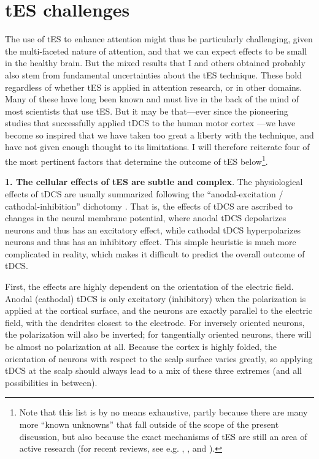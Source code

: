 \documentclass[11pt,]{memoir}
\let\rmarkdownfootnote\footnote%
\def\footnote{\protect\rmarkdownfootnote}
\begin{document}
\hypertarget{tes-challenges}{%
\section{tES challenges}\label{tes-challenges}}

The use of tES to enhance attention might thus be particularly challenging, given the multi-faceted nature of attention, and that we can expect effects to be small in the healthy brain. But the mixed results that I and others obtained probably also stem from fundamental uncertainties about the tES technique. These hold regardless of whether tES is applied in attention research, or in other domains. Many of these have long been known \autocites{Bikson2019}{Reato2019} and must live in the back of the mind of most scientists that use tES. But it may be that---ever since the pioneering studies that successfully applied tDCS to the human motor cortex \autocites{Nitsche2000}{Nitsche2001}---we have become so inspired that we have taken too great a liberty with the technique, and have not given enough thought to its limitations. I will therefore reiterate four of the most pertinent factors that determine the outcome of tES below\footnote{Note that this list is by no means exhaustive, partly because there are many more ``known unknowns'' that fall outside of the scope of the present discussion, but also because the exact mechanisms of tES are still an area of active research (for recent reviews, see e.g. \textcite{Fertonani2017}, \textcite{Bestmann2014}, and \textcite{Jackson2016}).}.

\textbf{1. The cellular effects of tES are subtle and complex}. The physiological effects of tDCS are usually summarized following the ``anodal-excitation / cathodal-inhibition'' dichotomy \autocite{Jacobson2012}. That is, the effects of tDCS are ascribed to changes in the neural membrane potential, where anodal tDCS depolarizes neurons and thus has an excitatory effect, while cathodal tDCS hyperpolarizes neurons and thus has an inhibitory effect. This simple heuristic is much more complicated in reality, which makes it difficult to predict the overall outcome of tDCS.

First, the effects are highly dependent on the orientation of the electric field. Anodal (cathodal) tDCS is only excitatory (inhibitory) when the polarization is applied at the cortical surface, and the neurons are exactly parallel to the electric field, with the dendrites closest to the electrode. For inversely oriented neurons, the polarization will also be inverted; for tangentially oriented neurons, there will be almost no polarization at all. Because the cortex is highly folded, the orientation of neurons with respect to the scalp surface varies greatly, so applying tDCS at the scalp should always lead to a mix of these three extremes (and all possibilities in between). \autocite{Reato2019}
\end{document}
